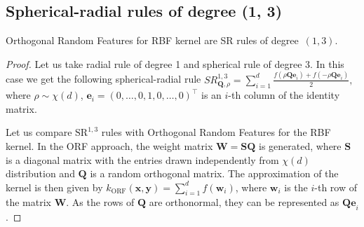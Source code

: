 \subsection{Spherical-radial rules of degree (1, 3)}
\begin{proposition}
Orthogonal Random Features for RBF kernel are SR rules of degree~$(1, 3)$.
\end{proposition}
\begin{proof}
    Let us take radial rule of degree 1 and spherical rule of degree 3.
    In this case we get the following spherical-radial rule
    ${SR^{1, 3}_{\mathbf{Q}, \rho} = \sum_{i = 1}^d
    \frac{f(\rho\mathbf{Qe}_i) + f(-\rho\mathbf{Qe}_i)}{2},}$
    where ${\rho \sim \chi(d)}$,
    ${\mathbf{e}_i = (0, \ldots, 0, 1, 0, \ldots, 0)^{\boldsymbol{\top}}}$
    is an $i$-th column of the identity matrix.

    Let us compare $\text{SR}^{1,3}$ rules with Orthogonal Random Features \citep{felix2016orthogonal} for the RBF kernel.
    In the ORF approach, the weight matrix $\mathbf{W} = \mathbf{SQ}$ is generated, where $\mathbf{S}$ is a diagonal matrix with the entries drawn independently from $\chi(d)$ distribution and $\mathbf{Q}$ is a random orthogonal matrix.
    The approximation of the kernel is then given by
    $k_{\text{ORF}}(\mathbf{x}, \mathbf{y}) = \sum_{i = 1}^d f(\mathbf{w}_i)$, where $\mathbf{w}_i$ is the $i$-th row of the matrix $\mathbf{W}$.
    As the rows of $\mathbf{Q}$ are orthonormal, they can be represented as $\mathbf{Qe}_i$.
\end{proof}



